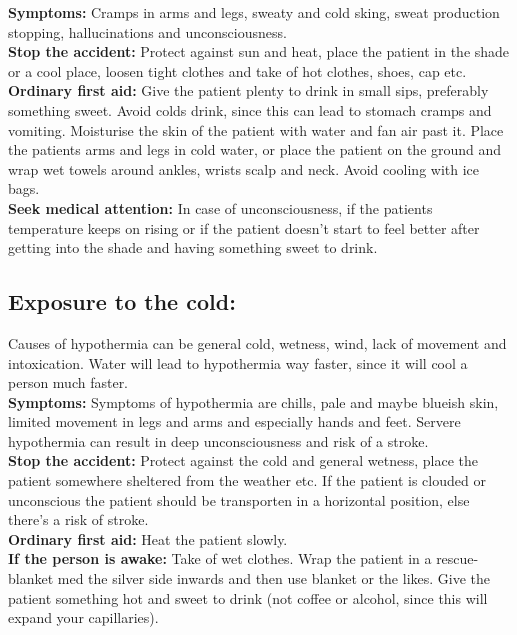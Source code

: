 \documentclass[../../../main.tex]{subfiles}
\begin{document}
\begin{multicols}{2}
\textbf{Symptoms:}
Cramps in arms and legs, sweaty and cold sking, sweat production stopping, hallucinations and unconsciousness. 
\\

\textbf{Stop the accident:} Protect against sun and heat, place the patient in the shade or a cool place, loosen tight clothes and take of hot clothes, shoes, cap etc.
\\

\textbf{Ordinary first aid:} Give the patient plenty to drink in small sips, preferably something sweet. Avoid colds drink, since this can lead to stomach cramps and vomiting. Moisturise the skin of the patient with water and fan air past it. Place the patients arms and legs in cold water, or place the patient on the ground and wrap wet towels around ankles, wrists scalp and neck. Avoid cooling with ice bags.
\\

\textbf{Seek medical attention:} In case of unconsciousness, if the patients temperature keeps on rising or if the patient doesn't start to feel better after getting into the shade and having something sweet to drink. 
\\
\subsection*{Exposure to the cold:} Causes of hypothermia can be general cold, wetness, wind, lack of movement and intoxication. Water will lead to hypothermia way faster, since it will cool a person much faster.
\\

\textbf{Symptoms:} Symptoms of hypothermia are chills, pale and maybe blueish skin, limited movement in legs and arms and especially hands and feet. Servere hypothermia can result in deep unconsciousness and risk of a stroke.
\\

\textbf{Stop the accident:} Protect against the cold and general wetness, place the patient somewhere sheltered from the weather etc. If the patient is clouded or unconscious the patient should be transporten in a horizontal position, else there's a risk of stroke.
\\

\textbf{Ordinary first aid:} Heat the patient slowly.
\\

\textbf{If the person is awake:} Take of wet clothes. Wrap the patient in a rescue-blanket med the silver side inwards and then use blanket or the likes. Give the patient something hot and sweet to drink (not coffee or alcohol, since this will expand your capillaries).
\\


\end{multicols}
\end{document}
